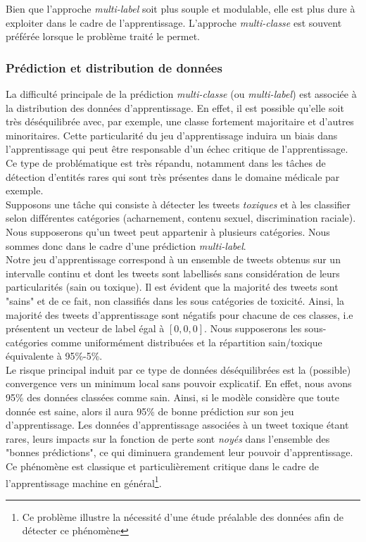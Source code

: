 \noindent Bien que l'approche \textit{multi-label} soit plus souple et modulable, elle est plus dure à exploiter dans le cadre de l'apprentissage. L'approche \textit{multi-classe} est souvent préférée lorsque le problème traité le permet.

\subsubsection{Prédiction et distribution de données}
La difficulté principale de la prédiction \textit{multi-classe} (ou \textit{multi-label}) est associée à la distribution des données d'apprentissage. En effet, il est possible qu'elle soit très déséquilibrée avec, par exemple, une classe fortement majoritaire et d'autres minoritaires. Cette particularité du jeu d'apprentissage induira un biais dans l'apprentissage qui peut être responsable d'un échec critique de l'apprentissage. Ce type de problématique est très répandu, notamment dans les tâches de détection d'entités rares qui sont très présentes dans le domaine médicale par exemple.\\

\noindent Supposons une tâche qui consiste à détecter les tweets \textit{toxiques} et à les classifier selon différentes catégories (acharnement, contenu sexuel, discrimination raciale). Nous supposerons qu'un tweet peut appartenir à plusieurs catégories. Nous sommes donc dans le cadre d'une prédiction \textit{multi-label}.\\

\noindent Notre jeu d'apprentissage correspond à un ensemble de tweets obtenus sur un intervalle continu et dont les tweets sont labellisés sans considération de leurs particularités (sain ou toxique). Il est évident que la majorité des tweets sont "sains" et de ce fait, non classifiés dans les sous catégories de toxicité. Ainsi, la majorité des tweets d'apprentissage sont négatifs pour chacune de ces classes, i.e présentent un vecteur de label égal à $[0, 0, 0]$. Nous supposerons les sous-catégories comme uniformément distribuées et la répartition sain/toxique équivalente à 95\%-5\%. \\

\noindent Le risque principal induit par ce type de données déséquilibrées est la (possible) convergence vers un minimum local sans pouvoir explicatif. En effet, nous avons 95\% des données classées comme sain. Ainsi, si le modèle considère que toute donnée est saine, alors il aura 95\% de bonne prédiction sur son jeu d'apprentissage. Les données d'apprentissage associées à un tweet toxique étant rares, leurs impacts sur la fonction de perte sont \textit{noyés} dans l'ensemble des "bonnes prédictions", ce qui diminuera grandement leur pouvoir d'apprentissage. Ce phénomène est classique et particulièrement critique dans le cadre de l'apprentissage machine en général\footnote{Ce problème illustre la nécessité d'une étude préalable des données afin de détecter ce phénomène}.

